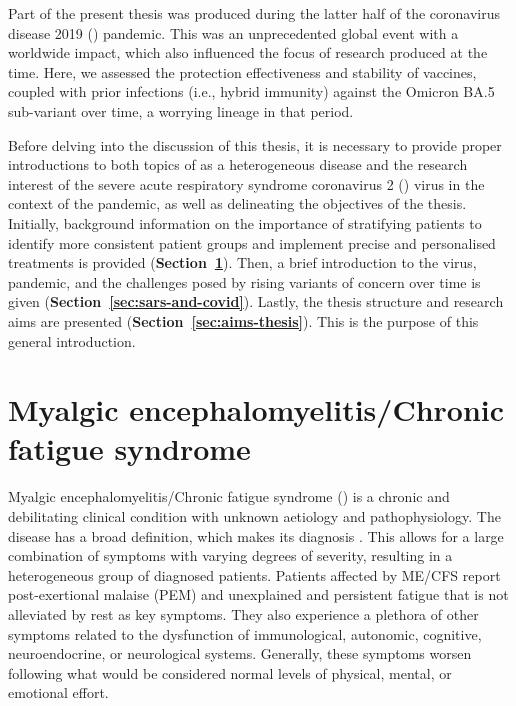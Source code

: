 Part of the present thesis was produced during the latter half of the coronavirus disease 2019 (\covid) pandemic. This was an unprecedented global event with a worldwide impact, which also influenced the focus of research produced at the time. Here, we assessed the protection effectiveness and stability of vaccines, coupled with prior infections (i.e., hybrid immunity) against the Omicron BA.5 sub-variant over time, a worrying lineage in that period.

Before delving into the discussion of this thesis, it is necessary to provide proper introductions to both topics of \cfs as a heterogeneous disease and the research interest of the severe acute respiratory syndrome coronavirus 2 (\sars) virus in the context of the pandemic, as well as delineating the objectives of the thesis. Initially, background information on the importance of stratifying \cfs patients to identify more consistent patient groups and implement precise and personalised treatments is provided (\textbf{Section~\ref{sec:background-mecfs}}). Then, a brief introduction to the \sars virus, \covid pandemic, and the challenges posed by rising variants of concern over time is given (\textbf{Section~\ref{sec:sars-and-covid}}). Lastly, the thesis structure and research aims are presented (\textbf{Section~\ref{sec:aims-thesis}}). This is the purpose of this general introduction.


\section{Myalgic encephalomyelitis/Chronic fatigue syndrome}
\label{sec:background-mecfs}

Myalgic encephalomyelitis/Chronic fatigue syndrome (\cfs) is a chronic and debilitating clinical condition with unknown aetiology and pathophysiology. The disease has a broad definition, which makes its diagnosis .
This allows for a large combination of symptoms with varying degrees of severity, resulting in a heterogeneous group of diagnosed patients.
Patients affected by ME/CFS report post-exertional malaise (PEM) and unexplained and persistent fatigue that is not alleviated by rest as key symptoms.
They also experience a plethora of other symptoms related to the dysfunction of immunological, autonomic, cognitive, neuroendocrine, or neurological systems.
Generally, these symptoms worsen following what would be considered normal levels of physical, mental, or emotional effort.

